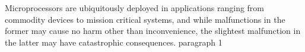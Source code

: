 \documentclass[12pt]{article}
\begin{document}
Microprocessors are ubiquitously deployed in applications ranging from commodity devices to mission critical systems, and while malfunctions in the former may cause no harm other than inconvenience, the slightest malfunction in the latter may have catastrophic consequences. 
paragraph 1\cite{Arimbasseri:2016ey}



\end{document}
